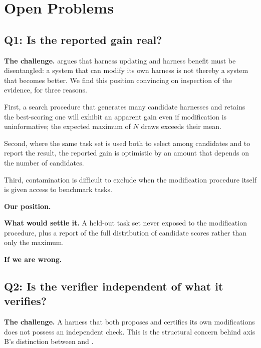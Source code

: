 \section{Open Problems}
\label{sec:open}

%

\subsection{Q1: Is the reported gain real?}

\textbf{The challenge.} \cite{lin2026notbenefit} argues that harness updating
and harness benefit must be disentangled: a system that can modify its own
harness is not thereby a system that becomes better. We find this position
convincing on inspection of the evidence, for three reasons.

First, a search procedure that generates many candidate harnesses and retains
the best-scoring one will exhibit an apparent gain even if modification is
uninformative; the expected maximum of $N$ draws exceeds their mean.

Second, where the same task set is used both to select among candidates and to
report the result, the reported gain is optimistic by an amount that depends on
the number of candidates.

Third, contamination is difficult to exclude when the modification procedure
itself is given access to benchmark tasks.

\textbf{Our position.} \todo{}

\textbf{What would settle it.} A held-out task set never exposed to the
modification procedure, plus a report of the full distribution of candidate
scores rather than only the maximum.

\textbf{If we are wrong.} 

\subsection{Q2: Is the verifier independent of what it verifies?}

\textbf{The challenge.} A harness that both proposes and certifies its own
modifications does not possess an independent check. This is the structural
concern behind axis B's distinction between  and
.

